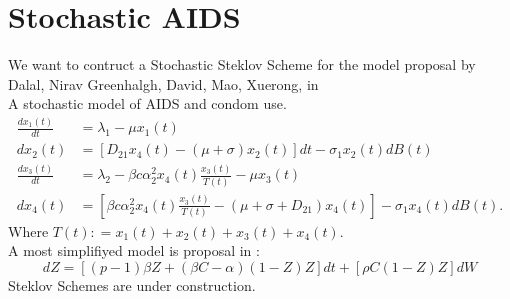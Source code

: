 \documentclass[review]{elsarticle}
\begin{document}
	\section{Stochastic AIDS}
		We want to contruct a Stochastic Steklov Scheme for the model proposal by Dalal, Nirav
		Greenhalgh, David, Mao, Xuerong, in \cite{Dalal2007}\\
		A stochastic model of AIDS and condom use.
		\begin{align*}
			\frac{dx_1(t)}{dt} & = \lambda_1 - \mu x_1(t)		\\
			dx_2(t) & =
				\left[
					D_{21} x_4(t) - (\mu + \sigma) x_2(t)
				\right]
				dt
				- \sigma_1 x_2(t)dB(t)							\\
			\frac{dx_3(t)}{dt} &= 
				\lambda_2 - \beta c \alpha_2^2  x_4(t) \frac{x_3(t)}{T(t)} 
				- \mu x_3(t)									\\
			dx_4(t) &= 
				\left[
					\beta c \alpha_2^2  x_4(t) \frac{x_3(t)}{T(t)}
					-(\mu +\sigma + D_{21}) x_4(t)
				\right]
				- \sigma_1 x_4(t) dB(t).
		\end{align*}
		Where $T(t): = x_1(t)+ x_2(t)+ x_3(t)+ x_4(t)$.
		\\
		A most simplifiyed model is proposal in \cite{Ding2008}:
		\begin{equation*}
			dZ = 
			\left[
				(p-1) \beta Z
				+ (\beta C -\alpha )(1-Z)Z
			\right]dt
			+
			\left[
				\rho C (1-Z)Z
			\right]dW
		\end{equation*}
		Steklov Schemes are under construction.
		
		
		
	
	
\end{document}
